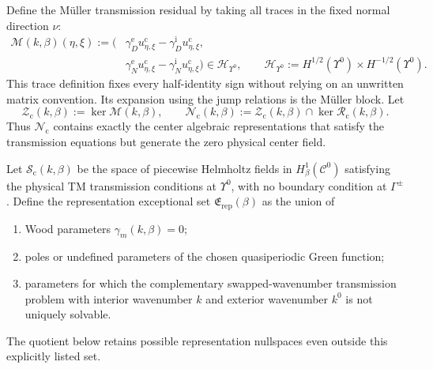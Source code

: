 Define the M\"uller transmission residual by taking all traces in the fixed
normal direction $\nu$:
\begin{equation}
\begin{split}
  \mathcal M(k,\beta)(\eta,\xi):=
  \bigl(&\gamma_D^{\mathrm e}u_{\eta,\xi}^{\mathrm c}
         -\gamma_D^{\mathrm i}u_{\eta,\xi}^{\mathrm c},\\
        &\gamma_N^{\mathrm e}u_{\eta,\xi}^{\mathrm c}
         -\gamma_N^{\mathrm i}u_{\eta,\xi}^{\mathrm c}\bigr)
  \in\mathcal H_{\Upsilon^0},
  \qquad
  \mathcal H_{\Upsilon^0}:=H^{1/2}(\Upsilon^0)\times H^{-1/2}(\Upsilon^0).
\end{split}
\label{eq:Muller-residual}
\end{equation}
This trace definition fixes every half-identity sign without relying on an
unwritten matrix convention.  Its expansion using the jump relations is the
M\"uller block.  Let
\begin{equation}
  \mathcal Z_{\mathrm c}(k,\beta):=\ker\mathcal M(k,\beta),
  \qquad
  \mathcal N_{\mathrm c}(k,\beta):=
  \mathcal Z_{\mathrm c}(k,\beta)\cap\ker\mathcal R_{\mathrm c}(k,\beta).
  \label{eq:center-nullspaces}
\end{equation}
Thus $\mathcal N_{\mathrm c}$ contains exactly the center algebraic
representations that satisfy the transmission equations but generate the zero
physical center field.

Let $\mathcal S_{\mathrm c}(k,\beta)$ be the space of piecewise Helmholtz
fields in $H^1_\beta(\mathcal C^0)$ satisfying the physical TM transmission
conditions at $\Upsilon^0$, with no boundary condition at $\Gamma^\pm$.
Define the representation exceptional set $\mathfrak E_{\mathrm{rep}}(\beta)$
as the union of
\begin{enumerate}[label=(\roman*),leftmargin=2.2em]
  \item Wood parameters $\gamma_m(k,\beta)=0$;
  \item poles or undefined parameters of the chosen quasiperiodic Green
  function;
  \item parameters for which the complementary swapped-wavenumber transmission
  problem with interior wavenumber $k$ and exterior wavenumber $k^0$ is not
  uniquely solvable.
\end{enumerate}
The quotient below retains possible representation nullspaces even outside
this explicitly listed set.

